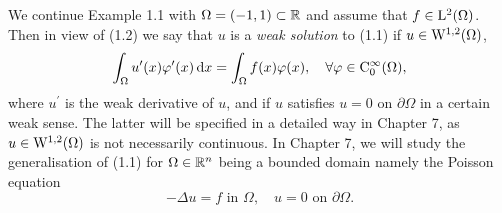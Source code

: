 \begin{ex}
  We continue Example 1.1 with $\Omega = (-1,1) \subset \mathbb{R}$ and assume that $f \in \mathrm{L}^2(\Omega)$.
  Then in view of (1.2) we say that $u$ is a \emph{weak solution} to (1.1) if $u \in \mathrm{W}^{1,2}(\Omega)$,
  $$
  \int_\Omega u^\prime(x) \varphi^\prime(x) \, {\operatorname{d}\!{x}} = \int_\Omega f(x) \varphi(x), \quad \forall \varphi \in \mathrm{C}_0^\infty(\Omega),
  $$
  where $u^\prime$ is the weak derivative of $u$, and if $u$ satisfies $u = 0$ on $\partial \Omega$ in a certain weak sense.
  The latter will be specified in a detailed way in Chapter 7, as $u \in \mathrm{W}^{1,2}(\Omega)$ is not necessarily continuous.
  In Chapter 7, we will study the generalisation of (1.1) for $\Omega \in \mathbb{R}^n$ being a bounded domain namely the Poisson equation
  $$
  -\Delta u = f \text{ in } \Omega, \quad u = 0 \text{ on } \partial \Omega.
  $$
\end{ex}
